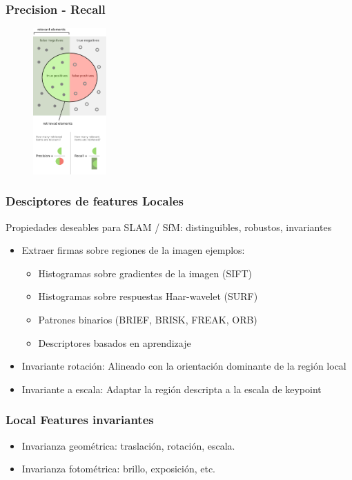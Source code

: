 \begin{frame}
	\frametitle{Precision - Recall}
	\footnotesize
	
	
	\begin{figure}
		\includegraphics[width=0.25\textwidth]{./images/precision_recall.pdf}
	\end{figure}
\end{frame}

\begin{frame}
	\frametitle{Desciptores de features Locales}
	\footnotesize
	
	Propiedades deseables para SLAM / SfM: distinguibles, robustos, invariantes
	\begin{itemize}
		\item Extraer firmas sobre regiones de la imagen ejemplos:
		\begin{itemize}
			\item Histogramas sobre gradientes de la imagen (SIFT)
			\item Histogramas sobre respuestas Haar-wavelet (SURF)
			\item Patrones binarios (BRIEF, BRISK, FREAK, ORB)
			\item Descriptores basados en aprendizaje
		\end{itemize}
		\item Invariante rotación: Alineado con la orientación dominante de la región local
		\item Invariante a escala: Adaptar la región descripta a la escala de keypoint
	\end{itemize}

	
\end{frame}

\begin{frame}
	\frametitle{Local Features invariantes}
	\footnotesize
	
	\begin{itemize}
		\item Invarianza geométrica: traslación, rotación, escala.
		\item Invarianza fotométrica: brillo, exposición, etc.
	\end{itemize}
	 

\end{frame}


